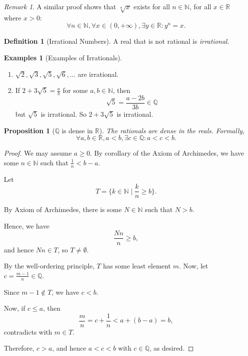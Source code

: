 \documentclass{article}
\newtheorem{proposition}[theorem]{Proposition}
\theoremstyle{definition}
\newtheorem{definition}[theorem]{Definition}
\newtheorem{examples}[theorem]{Examples}
\theoremstyle{remark}
\newtheorem{remark}[theorem]{Remark}
\newcommand{\pqty}[1]{\left(#1\right)}
\newcommand{\set}[2]{\{#1\mid #2\}}
\newcommand{\oointv}[2]{(#1,#2)}
\newcommand{\plusinfty}{+\infty}
\newcommand{\NN}{\mathbb{N}}
\newcommand{\QQ}{\mathbb{Q}}
\newcommand{\RR}{\mathbb{R}}
\begin{document}
\begin{remark}
    A similar proof shows that \(\sqrt[n]{x}\) exists for all \(n \in \NN\), for all \(x \in \RR\) where \(x > 0\):
    \[
        \forall n \in \NN, \forall x \in \oointv{0}{\plusinfty}, \exists y \in \RR: y^n = x.
    \]
\end{remark}

\begin{definition}[Irrational Numbers]
    A real that is not rational is \emph{irrational}.
\end{definition}

\begin{examples}[Examples of Irrationals]
    \begin{enumerate}
        \item \(\sqrt{2}, \sqrt{3}, \sqrt{5}, \sqrt{6}, \ldots\) are irrational.
        \item If \(2 + 3 \sqrt{5} = \frac{a}{b}\) for some \(a, b \in \NN\), then
        \[
            \sqrt{5} = \frac{a - 2b}{3b} \in \QQ
        \]
        but \(\sqrt{5}\) is irrational. So \(2 + 3 \sqrt{5}\) is irrational.
    \end{enumerate}
\end{examples}

\begin{proposition}[\(\QQ\) is dense in \(\RR\)]
    The rationals are \emph{dense} in the reals. Formally,
    \[
        \forall a, b \in \RR, a < b, \exists c \in \QQ: a < c < b.
    \]
\end{proposition}

\begin{proof}
    We may assume \(a \geq 0\). By corollary of the Axiom of Archimedes, we have some \(n \in \NN\) such that \(\frac{1}{n} < b - a\).

    Let
    \[
        T = \set{k \in \NN}{\frac{k}{n} \geq b}.
    \]

    By Axiom of Archimedes, there is some \(N \in \NN\) such that \(N > b\).
    
    Hence, we have
    \[
        \frac{Nn}{n} \geq b,
    \]
    and hence \(Nn \in T\), so \(T \neq \emptyset\).

    By the well-ordering principle, \(T\) has some least element \(m\). Now, let \(c = \frac{m - 1}{n} \in \QQ\).

    Since \(m - 1 \notin T\), we have \(c < b\).

    Now, if \(c \leq a\), then
    \[
        \frac{m}{n} = c + \frac{1}{n} < a + \pqty{b - a} = b,
    \]
    contradicts with \(m \in T\).

    Therefore, \(c > a\), and hence \(a < c < b\) with \(c \in \QQ\), as desired.
\end{proof}
\end{document}

